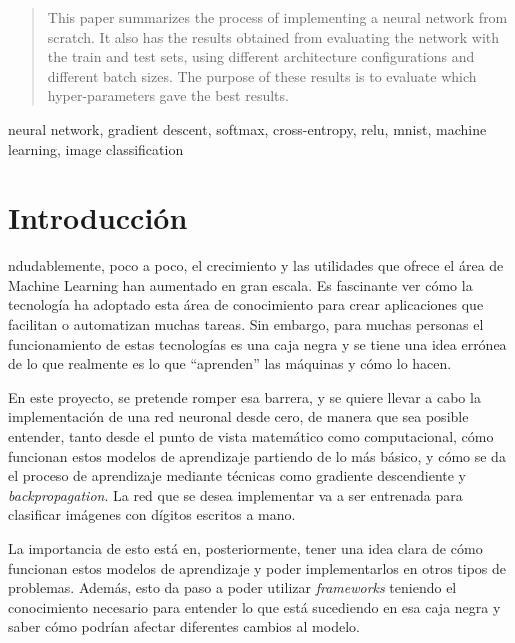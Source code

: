 \documentclass[journal]{IEEEtran}
\begin{document}







\maketitle


\begin{abstract}
This paper summarizes the process of implementing a neural network from scratch. It also has the results obtained from
evaluating the network with the train and test sets, using different architecture configurations and different batch sizes. 
The purpose of these results is to evaluate which hyper-parameters gave the best results.
\end{abstract}

\begin{IEEEkeywords}
neural network, gradient descent, softmax, cross-entropy, relu, mnist, machine learning, image classification
\end{IEEEkeywords}

\IEEEpeerreviewmaketitle


\section{Introducción}
ndudablemente, poco a poco, el crecimiento y las utilidades que ofrece el área de Machine Learning han aumentado en gran escala. Es 
fascinante ver cómo la tecnología ha adoptado esta área de conocimiento para crear aplicaciones que facilitan o automatizan
muchas tareas. Sin embargo, para muchas personas el funcionamiento
de estas tecnologías es una caja negra y se tiene una idea errónea
de lo que realmente es lo que ``aprenden'' las máquinas y cómo lo hacen.
\par En este proyecto, se pretende romper esa barrera, y se quiere llevar a cabo la implementación de una red neuronal desde cero, de manera que sea posible entender, tanto desde el punto de vista matemático como computacional, cómo funcionan estos modelos de aprendizaje partiendo
de lo más básico, y cómo se da el proceso de aprendizaje mediante
técnicas como gradiente descendiente y \textit{backpropagation}. La red
que se desea implementar va a ser entrenada para clasificar imágenes con
dígitos escritos a mano.
\par La importancia de esto está en, posteriormente, tener una
idea clara de cómo funcionan estos modelos de aprendizaje y poder
implementarlos en otros tipos de problemas. Además, esto da paso
a poder utilizar \textit{frameworks} teniendo el conocimiento necesario para entender lo que está
sucediendo en esa caja negra y saber cómo podrían afectar diferentes cambios al modelo.
\end{document}
